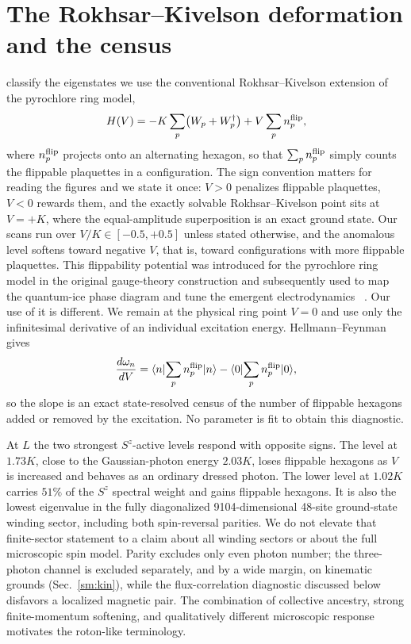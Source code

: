 \documentclass[aps,prl,twocolumn,amsmath,amssymb,superscriptaddress,
longbibliography,floatfix]{revtex4-2}
\begin{document}
\section{The Rokhsar--Kivelson deformation and the census}
\label{sm:census}

classify the eigenstates we use the conventional Rokhsar--Kivelson
extension of the pyrochlore ring model,
\begin{equation}
 H(V)=-K\sum_p\!\left(W_p+W_p^\dagger\right)
      +V\sum_p n_p^{\rm flip},
 \label{eq:rk}
\end{equation}
where $n_p^{\rm flip}$ projects onto an alternating hexagon, so that
$\sum_p n_p^{\rm flip}$ simply counts the flippable plaquettes in a
configuration. The sign convention matters for reading the figures
and we state it once: $V>0$ penalizes flippable plaquettes, $V<0$
rewards them, and the exactly solvable Rokhsar--Kivelson point sits at
$V=+K$, where the equal-amplitude superposition is an exact ground
state. Our scans run over $V/K\in[-0.5,+0.5]$ unless stated
otherwise, and the anomalous level softens toward negative $V$, that
is, toward configurations with more flippable plaquettes. This
flippability potential was introduced for the pyrochlore ring model in
the original gauge-theory construction and subsequently used to map
the quantum-ice phase diagram and tune the emergent electrodynamics
~\cite{Hermele2004,RokhsarKivelson1988,Shannon2012,Pace2021}. Our use
of it is different. We remain at the physical ring point $V=0$ and
use only the infinitesimal derivative of an individual excitation
energy. Hellmann--Feynman gives
\begin{equation}
 \frac{d\omega_n}{dV}
 =\langle n|\!\sum_p n_p^{\rm flip}|n\rangle
 -\langle 0|\!\sum_p n_p^{\rm flip}|0\rangle ,
 \label{eq:hf}
\end{equation}
so the slope is an exact state-resolved census of the number of
flippable hexagons added or removed by the excitation. No parameter is
fit to obtain this diagnostic.

At $L$ the two strongest $S^z$-active levels respond with opposite
signs. The level at $1.73K$, close to the Gaussian-photon energy
$2.03K$, loses flippable hexagons as $V$ is increased and behaves as an
ordinary dressed photon. The lower level at $1.02K$ carries $51\%$ of
the $S^z$ spectral weight and gains flippable hexagons. It is also the
lowest eigenvalue in the fully diagonalized 9104-dimensional
48-site ground-state winding sector, including both spin-reversal
parities. We do not elevate that finite-sector statement to a claim
about all winding sectors or about the full microscopic spin model.
Parity excludes only even photon number; the three-photon channel is
excluded separately, and by a wide margin, on kinematic grounds
(Sec.~\ref{sm:kin}), while the flux-correlation diagnostic
discussed below disfavors a localized magnetic pair. The combination
of collective ancestry, strong finite-momentum softening, and
qualitatively different microscopic response motivates the roton-like
terminology.
\end{document}
